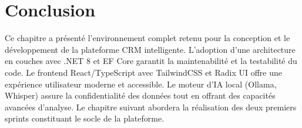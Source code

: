 \section{Conclusion}
\label{sec:chap3_conclusion}

\noindent Ce chapitre a présenté l'environnement complet retenu pour la conception et le
développement de la plateforme CRM intelligente. L'adoption d'une architecture en couches
avec .NET 8 et EF Core garantit la maintenabilité et la testabilité du code. Le frontend
React/TypeScript avec TailwindCSS et Radix UI offre une expérience utilisateur moderne et
accessible. Le moteur d'IA local (Ollama, Whisper) assure la confidentialité des données
tout en offrant des capacités avancées d'analyse. Le chapitre suivant abordera la réalisation
des deux premiers sprints constituant le socle de la plateforme.
